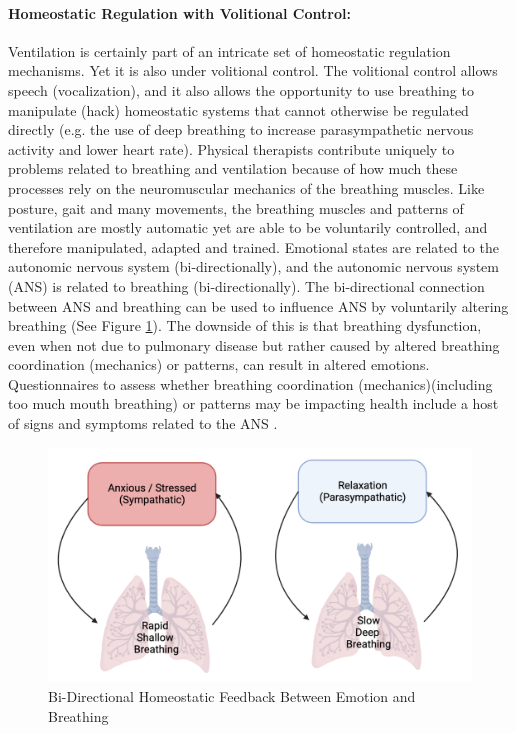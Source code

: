 \paragraph{Homeostatic Regulation with Volitional Control:} Ventilation is certainly part of an intricate set of homeostatic regulation mechanisms. Yet it is also under volitional control. The volitional control allows speech (vocalization), and it also allows the opportunity to use breathing to manipulate (hack) homeostatic systems that cannot otherwise be regulated directly (e.g. the use of deep breathing to increase parasympathetic nervous activity and lower heart rate). Physical therapists contribute uniquely to problems related to breathing and ventilation because of how much these processes rely on the neuromuscular mechanics of the breathing muscles. Like posture, gait and many movements, the breathing muscles and patterns of ventilation are mostly automatic yet are able to be voluntarily controlled, and therefore manipulated, adapted and trained. Emotional states are related to the autonomic nervous system (bi-directionally), and the autonomic nervous system (ANS) is related to breathing (bi-directionally). The bi-directional connection between ANS and breathing can be used to influence ANS by voluntarily altering breathing (See Figure \ref{fig:homeostatic_feedback}). The downside of this is that breathing dysfunction, even when not due to pulmonary disease but rather caused by altered breathing coordination (mechanics) or patterns, can result in altered emotions. Questionnaires to assess whether breathing coordination (mechanics)(including too much mouth breathing) or patterns may be impacting health include a host of signs and symptoms related to the ANS \cite{gilbert_recognizing_2014}.

\begin{figure}[]
    \centering
    \includegraphics[width=0.65\linewidth]{./figure/ventilation/homeostatic_feedback.png}
    \caption{Bi-Directional Homeostatic Feedback Between Emotion and Breathing}
    \label{fig:homeostatic_feedback}
\end{figure}

